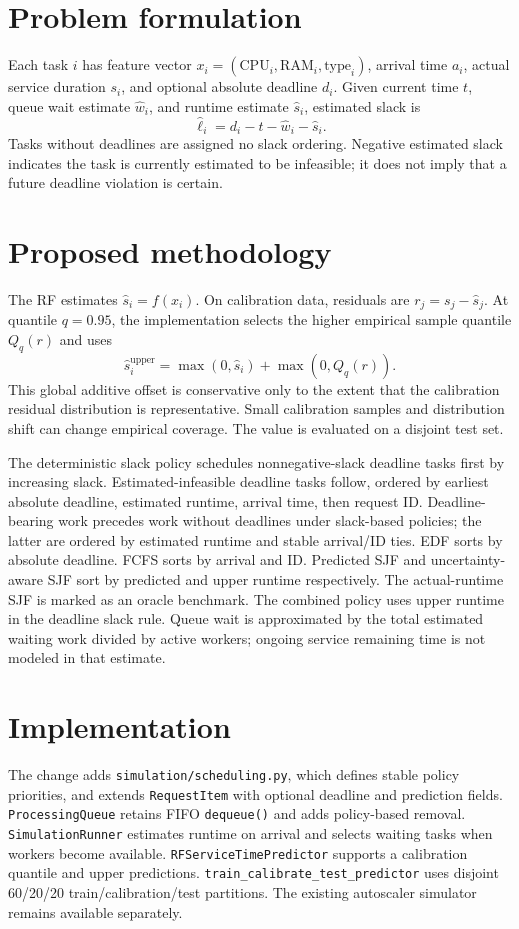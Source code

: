 \documentclass[11pt]{article}
\begin{document}
\section{Problem formulation}
Each task $i$ has feature vector $x_i=(\mathrm{CPU}_i,\mathrm{RAM}_i,\mathrm{type}_i)$, arrival time $a_i$, actual service duration $s_i$, and optional absolute deadline $d_i$. Given current time $t$, queue wait estimate $\widehat{w}_i$, and runtime estimate $\widehat{s}_i$, estimated slack is
\[
\widehat{\ell}_i=d_i-t-\widehat{w}_i-\widehat{s}_i.
\]
Tasks without deadlines are assigned no slack ordering. Negative estimated slack indicates the task is currently estimated to be infeasible; it does not imply that a future deadline violation is certain.

\section{Proposed methodology}
The RF estimates $\widehat{s}_i=f(x_i)$. On calibration data, residuals are $r_j=s_j-\widehat{s}_j$. At quantile $q=0.95$, the implementation selects the higher empirical sample quantile $Q_q(r)$ and uses
\[
\widehat{s}^{\mathrm{upper}}_i=\max(0,\widehat{s}_i)+\max(0,Q_q(r)).
\]
This global additive offset is conservative only to the extent that the calibration residual distribution is representative. Small calibration samples and distribution shift can change empirical coverage. The value is evaluated on a disjoint test set.

The deterministic slack policy schedules nonnegative-slack deadline tasks first by increasing slack. Estimated-infeasible deadline tasks follow, ordered by earliest absolute deadline, estimated runtime, arrival time, then request ID. Deadline-bearing work precedes work without deadlines under slack-based policies; the latter are ordered by estimated runtime and stable arrival/ID ties. EDF sorts by absolute deadline. FCFS sorts by arrival and ID. Predicted SJF and uncertainty-aware SJF sort by predicted and upper runtime respectively. The actual-runtime SJF is marked as an oracle benchmark. The combined policy uses upper runtime in the deadline slack rule. Queue wait is approximated by the total estimated waiting work divided by active workers; ongoing service remaining time is not modeled in that estimate.

\section{Implementation}
The change adds \verb|simulation/scheduling.py|, which defines stable policy priorities, and extends \verb|RequestItem| with optional deadline and prediction fields. \verb|ProcessingQueue| retains FIFO \verb|dequeue()| and adds policy-based removal. \verb|SimulationRunner| estimates runtime on arrival and selects waiting tasks when workers become available. \verb|RFServiceTimePredictor| supports a calibration quantile and upper predictions. \verb|train_calibrate_test_predictor| uses disjoint 60/20/20 train/calibration/test partitions. The existing autoscaler simulator remains available separately.
\end{document}
